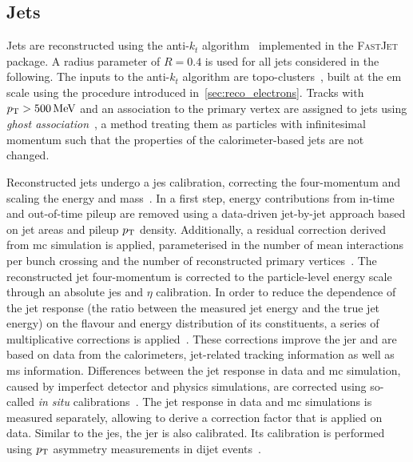 \subsection{Jets}\label{sec:jets}

Jets are reconstructed using the anti-$k_t$ algorithm~\cite{Cacciari:2008gp} implemented in the \textsc{FastJet}~\cite{Fastjet,Cacciari:2006sm} package. A radius parameter of $R=0.4$ is used for all jets considered in the following. The inputs to the anti-$k_t$ algorithm are topo-clusters~\cite{Aad:2020flx}, built at the \gls{em} scale using the procedure introduced in~\cref{sec:reco_electrons}. Tracks with $\pt > \SI{500}{\MeV}$ and an association to the primary vertex are assigned to jets using \textit{ghost association}~\cite{Cacciari:2007fd}, a method treating them as particles with infinitesimal momentum such that the properties of the calorimeter-based jets are not changed. 


Reconstructed jets undergo a \gls{jes} calibration, correcting the four-momentum and scaling the energy and mass~\cite{Aad:2020flx}. In a first step, energy contributions from in-time and out-of-time pileup are removed using a data-driven jet-by-jet approach based on jet areas and pileup $p_{\textrm{T}}$ density. Additionally, a residual correction derived from \gls{mc} simulation is applied, parameterised in the number of mean interactions per bunch crossing and the number of reconstructed primary vertices~\cite{Aad:2020flx,Cacciari:2007fd}. The reconstructed jet four-momentum is corrected to the particle-level energy scale through an absolute \gls{jes} and $\eta$ calibration.  In order to reduce the dependence of the jet response (\ie the ratio between the measured jet energy and the true jet energy) on the flavour and energy distribution of its constituents, a series of multiplicative corrections is applied~\cite{PERF-2011-03}. These corrections improve the \gls{jer} and are based on data from the calorimeters, jet-related tracking information as well as \gls{ms} information. Differences between the jet response in data and \gls{mc} simulation, caused by imperfect detector and physics simulations, are corrected using so-called \textit{in situ} calibrations~\cite{Aad:2020flx}. The jet response in data and \gls{mc} simulations is measured separately, allowing to derive a correction factor that is applied on data. Similar to the \gls{jes}, the \gls{jer} is also calibrated. Its calibration is performed using $p_{\textrm{T}}$ asymmetry measurements in dijet events~\cite{PERF-2014-02}.

